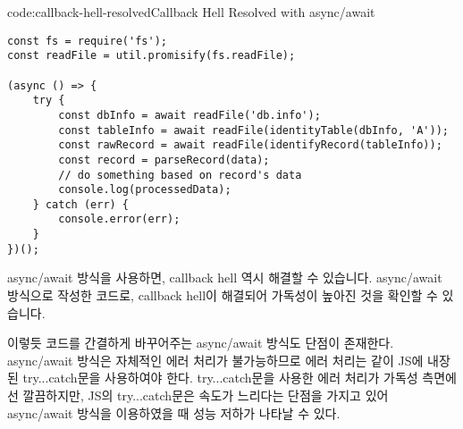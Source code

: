 \begin{codeenv}{code:callback-hell-resolved}{Callback Hell Resolved with async/await}\begin{verbatim}
const fs = require('fs');
const readFile = util.promisify(fs.readFile);

(async () => {
    try {
        const dbInfo = await readFile('db.info');
        const tableInfo = await readFile(identityTable(dbInfo, 'A'));
        const rawRecord = await readFile(identifyRecord(tableInfo));
        const record = parseRecord(data);
        // do something based on record's data
        console.log(processedData);
    } catch (err) {
        console.error(err);
    }
})();
\end{verbatim}
\end{codeenv}

async/await 방식을 사용하면, callback hell 역시 해결할 수 있습니다. \는 \을 async/await 방식으로 작성한 코드로, callback hell이 해결되어 가독성이 높아진 것을 확인할 수 있습니다. 

이렇듯 코드를 간결하게 바꾸어주는 async/await 방식도 단점이 존재한다. async/await 방식은 자체적인 에러 처리가 불가능하므로 에러 처리는 \과 같이 JS에 내장된 try...catch문을 사용하여야 한다. try...catch문을 사용한 에러 처리가 가독성 측면에선 깔끔하지만, JS의 try...catch문은 속도가 느리다는 단점을 가지고 있어 async/await 방식을 이용하였을 때 성능 저하가 나타날 수 있다.
